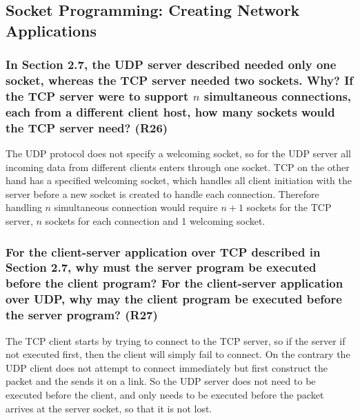 \subsection{Socket Programming: Creating Network Applications}



\subsubsection{In Section 2.7, the UDP server described needed only one socket, whereas the TCP server needed two sockets. Why? If the TCP server were to support $n$ simultaneous connections, each from a different client host, how many sockets would the TCP server need? (R26)}

The UDP protocol does not specify a welcoming socket, so for the UDP server all incoming data from different clients enters through one socket. TCP on the other hand has a specified welcoming socket, which handles all client initiation with the server before a new socket is created to handle each connection. Therefore handling $n$ simultaneous connection would require $n + 1$ sockets for the TCP server, $n$ sockets for each connection and 1 welcoming socket.



\subsubsection{For the client-server application over TCP described in Section 2.7, why must the server program be executed before the client program? For the client-server application over UDP, why may the client program be executed before the server program? (R27)}

The TCP client starts by trying to connect to the TCP server, so if the server if not executed first, then the client will simply fail to connect. On the contrary the UDP client does not attempt to connect immediately but first construct the packet and the sends it on a link. So the UDP server does not need to be executed before the client, and only needs to be executed before the packet arrives at the server socket, so that it is not lost.